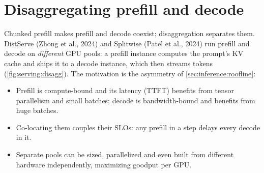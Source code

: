 \section{Disaggregating prefill and decode}\label{sec:serving:disagg}

Chunked prefill makes prefill and decode coexist; disaggregation separates them. DistServe (Zhong et
al., 2024) and Splitwise (Patel et al., 2024) run prefill and decode on \emph{different} GPU pools: a
prefill instance computes the prompt's KV cache and ships it to a decode instance, which then streams
tokens (\cref{fig:serving:disagg}). The motivation is the asymmetry of \cref{sec:inference:roofline}:
\begin{itemize}
  \item Prefill is compute-bound and its latency (TTFT) benefits from tensor parallelism and small
    batches; decode is bandwidth-bound and benefits from huge batches.
  \item Co-locating them couples their SLOs: any prefill in a step delays every decode in it.
  \item Separate pools can be sized, parallelized and even built from different hardware
    independently, maximizing goodput per GPU.
\end{itemize}

